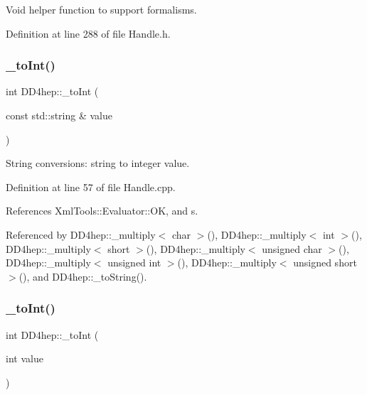Void helper function to support formalisms. 



Definition at line 288 of file Handle.\+h.

\hypertarget{group___d_d4_h_e_p___g_e_o_m_e_t_r_y_ga6222fc401a48bcb4a2c176291bf4821b}{}\label{group___d_d4_h_e_p___g_e_o_m_e_t_r_y_ga6222fc401a48bcb4a2c176291bf4821b} 
\subsubsection{\texorpdfstring{\+\_\+to\+Int()}{\_toInt()}\hspace{0.1cm}{\footnotesize\ttfamily [1/2]}}
{\footnotesize\ttfamily int D\+D4hep\+::\+\_\+to\+Int (\begin{DoxyParamCaption}\item[{const std\+::string \&}]{value }\end{DoxyParamCaption})}



String conversions\+: string to integer value. 



Definition at line 57 of file Handle.\+cpp.



References Xml\+Tools\+::\+Evaluator\+::\+OK, and s.



Referenced by D\+D4hep\+::\+\_\+multiply$<$ char $>$(), D\+D4hep\+::\+\_\+multiply$<$ int $>$(), D\+D4hep\+::\+\_\+multiply$<$ short $>$(), D\+D4hep\+::\+\_\+multiply$<$ unsigned char $>$(), D\+D4hep\+::\+\_\+multiply$<$ unsigned int $>$(), D\+D4hep\+::\+\_\+multiply$<$ unsigned short $>$(), and D\+D4hep\+::\+\_\+to\+String().

\hypertarget{group___d_d4_h_e_p___g_e_o_m_e_t_r_y_ga9663e908c8754854343673024b109bd4}{}\label{group___d_d4_h_e_p___g_e_o_m_e_t_r_y_ga9663e908c8754854343673024b109bd4} 
\subsubsection{\texorpdfstring{\+\_\+to\+Int()}{\_toInt()}\hspace{0.1cm}{\footnotesize\ttfamily [2/2]}}
{\footnotesize\ttfamily int D\+D4hep\+::\+\_\+to\+Int (\begin{DoxyParamCaption}\item[{int}]{value }\end{DoxyParamCaption})\hspace{0.3cm}{\ttfamily [inline]}}



